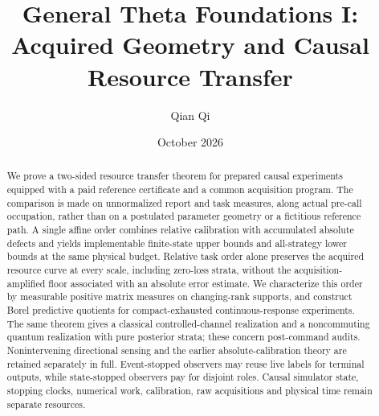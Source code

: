 \documentclass[11pt,reqno]{amsart}
\title[Acquired geometry and causal resource transfer]{General Theta Foundations I:\\Acquired Geometry and Causal Resource Transfer}
\author{Qian Qi}\date{October 2026}
\numberwithin{equation}{section}
\theoremstyle{definition}\newtheorem{definition}[theorem]{Definition}
\theoremstyle{remark}\newtheorem{remark}[theorem]{Remark}
\begin{document}
\begin{abstract}
We prove a two-sided resource transfer theorem for prepared causal experiments equipped with a paid reference certificate and a common acquisition program. The comparison is made on unnormalized report and task measures, along actual pre-call occupation, rather than on a postulated parameter geometry or a fictitious reference path. A single affine order combines relative calibration with accumulated absolute defects and yields implementable finite-state upper bounds and all-strategy lower bounds at the same physical budget. Relative task order alone preserves the acquired resource curve at every scale, including zero-loss strata, without the acquisition-amplified floor associated with an absolute error estimate. We characterize this order by measurable positive matrix measures on changing-rank supports, and construct Borel predictive quotients for compact-exhausted continuous-response experiments. The same theorem gives a classical controlled-channel realization and a noncommuting quantum realization with pure posterior strata; these concern post-command audits. Nonintervening directional sensing and the earlier absolute-calibration theory are retained separately in full. Event-stopped observers may reuse live labels for terminal outputs, while state-stopped observers pay for disjoint roles. Causal simulator state, stopping clocks, numerical work, calibration, raw acquisitions and physical time remain separate resources.
\end{abstract}
\maketitle








\appendix



\end{document}
